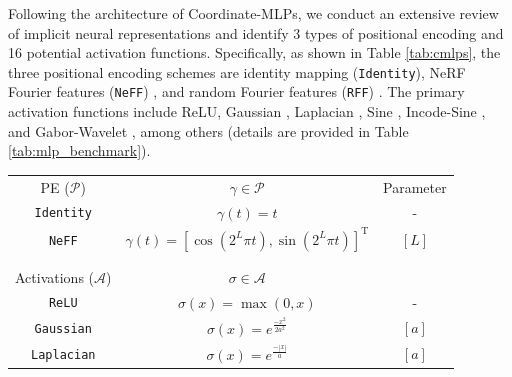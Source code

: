 \documentclass[letterpaper]{article} %
\begin{document}
Following the architecture of Coordinate-MLPs, we conduct an extensive review of implicit neural representations and identify 3 types of positional encoding and 16 potential activation functions. Specifically, as shown in Table \ref{tab:cmlps}, the three positional encoding schemes are identity mapping (\texttt{Identity}), NeRF Fourier features (\texttt{NeFF}) \cite{mildenhall2020nerf}, and random Fourier features (\texttt{RFF}) \cite{tancik2020ffn}. The primary activation functions include ReLU, Gaussian \cite{chng2022garf}, Laplacian \cite{ramasinghe2022activations}, Sine \cite{sitzmann2020siren}, Incode-Sine \cite{kazerouni2023incode}, and Gabor-Wavelet \cite{saragadam2023wire}, among others (details are provided in Table \ref{tab:mlp_benchmark}).

\begin{table}[!htbp]
    \centering
    \tabcolsep=0.0mm
    \fontsize{9}{11}\selectfont
    \begin{tabular}{ccc}
        PE ($\mathcal{P}$) & $\gamma \in \mathcal{P}$ & Parameter \\
        
        \texttt{Identity} & $\gamma({t})={t}$ & - \\

        \texttt{NeFF} & $\gamma({t})=[\cos (2^L \pi {t}), \sin (2^L \pi {t})]^{\mathrm{T}}$ & $[L]$ \\

         &  &  \\
        & \\
        
        \hline
        \hline
         Activations ($\mathcal{A}$) & $\sigma \in \mathcal{A}$ \\

         \hline
         \texttt{ReLU} & $\sigma(x)=\max(0, x)$ & - \\
         
         \texttt{Gaussian} & $\sigma(x)=e^{\frac{-x^2}{2a^2}}$ & $[a]$ \\

         \texttt{Laplacian} & $\sigma(x)=e^{\frac{-|x|}{a}}$  & $[a]$ \\


\end{tabular}
\end{table}
\end{document}
